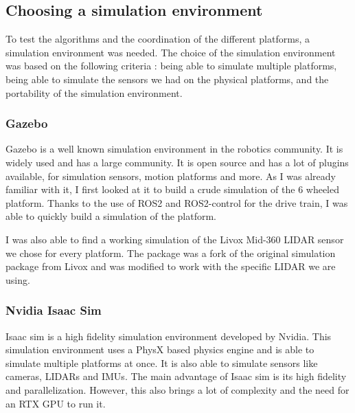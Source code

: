 \documentclass[12pt]{article}
\begin{document}
    \subsection{Choosing a simulation environment}

        To test the algorithms and the coordination of the different platforms, a simulation environment was needed. The choice of the simulation environment was based on the following criteria : being able to simulate multiple platforms, being able to simulate the sensors we had on the physical platforms, and the portability of the simulation environment.


        \subsubsection{Gazebo}
            Gazebo is a well known simulation environment in the robotics community. It is widely used and has a large community. It is open source and has a lot of plugins available, for simulation sensors, motion platforms and more. As I was already familiar with it, I first looked at it to build a crude simulation of the 6 wheeled platform. Thanks to the use of ROS2 and ROS2-control for the drive train, I was able to quickly build a simulation of the platform. 

            I was also able to find a working simulation of the Livox Mid-360 LIDAR sensor we chose for every platform. The package \cite{livox_lidar_simulation_fork} was a fork of the original simulation package from Livox \cite{livox_laser_simulation} and was modified to work with the specific LIDAR we are using.
            
            

        \subsubsection{Nvidia Isaac Sim}

            Isaac sim is a high fidelity simulation environment developed by Nvidia. This simulation environment uses a PhysX based physics engine and is able to simulate multiple platforms at once. It is also able to simulate sensors like cameras, LIDARs and IMUs. The main advantage of Isaac sim is its high fidelity and parallelization. However, this also brings a lot of complexity and the need for an RTX GPU to run it.
            
\end{document}
